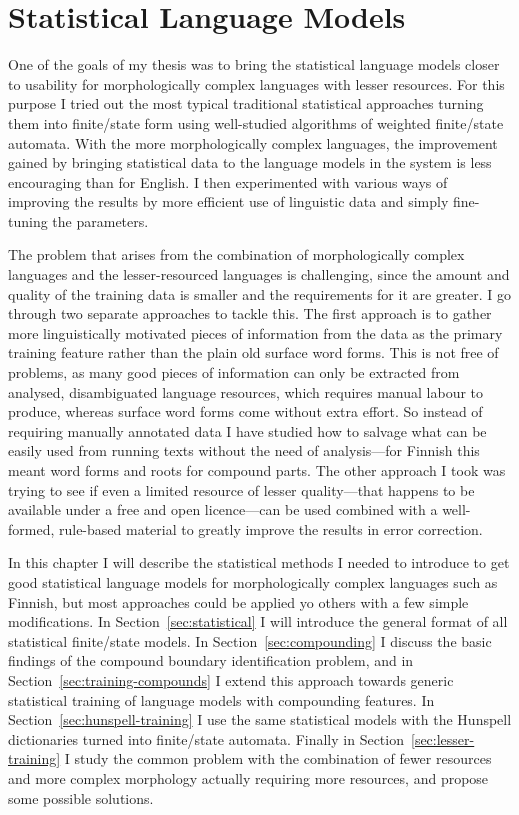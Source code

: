 \documentclass[officiallayout]{unihelcompling}
\begin{document}
\chapter{Statistical Language Models}
\label{chap:statistical-models}

One of the goals of my thesis was to bring the statistical language models
closer to usability for morphologically complex languages with lesser
resources. For this purpose I tried out the most typical traditional
statistical approaches turning them into finite\-/state form using well-studied
algorithms of weighted finite\-/state automata. With the more morphologically
complex languages, the improvement gained by bringing statistical data to the
language models in the system is less encouraging than for English. I then
experimented with various ways of improving the results by more efficient use
of linguistic data and simply fine-tuning the parameters.

The problem that arises from the combination of morphologically complex
languages and the lesser-resourced languages is challenging, since the amount
and quality of the training data is smaller and the requirements for it are
greater. I go through two separate approaches to tackle this. The first
approach is to gather more linguistically motivated pieces of information from
the data as the primary training feature rather than the plain old surface
word forms. This is not free of problems, as many good pieces of information
can only be extracted from analysed, disambiguated language resources,
which requires manual labour to produce, whereas surface word forms
come without extra effort. So instead of requiring manually annotated data I
have studied how to salvage what can be easily used from running texts without
the need of analysis---for Finnish this meant word forms and roots for compound
parts. The other approach I took was trying to see if even a limited
resource of lesser quality---that happens to be available under a free and open
licence---can be used combined with a well-formed, rule-based material to
greatly improve the results in error correction.

In this chapter I will describe the statistical methods I needed to introduce
to get good statistical language models for morphologically complex languages
such as Finnish, but most approaches could be applied yo others with a
few simple modifications. In Section~\ref{sec:statistical} I will introduce the
general format of all statistical finite\-/state models.  In
Section~\ref{sec:compounding} I discuss the basic findings of the compound boundary
identification problem, and in Section~\ref{sec:training-compounds} I extend
this approach towards generic statistical training of language models with
compounding features. In Section~\ref{sec:hunspell-training} I use the same
statistical models with the Hunspell dictionaries turned into finite\-/state
automata. Finally in Section~\ref{sec:lesser-training} I study the common
problem with the combination of fewer resources and more complex morphology
actually requiring more resources, and propose some possible solutions.
\end{document}

